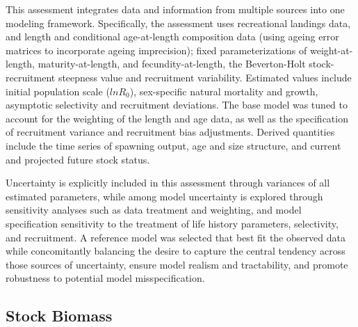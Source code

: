 \documentclass[11pt,
  english,
  a4paper,
]{article}
\begin{document}
\leavevmode\tagmcend\tagstructend\par


This assessment integrates data and information from multiple sources into one modeling framework. Specifically, the assessment uses recreational landings data, and length and conditional age-at-length composition data (using ageing error matrices to incorporate ageing imprecision); fixed parameterizations of weight-at-length, maturity-at-length, and fecundity-at-length, the Beverton-Holt stock-recruitment steepness value and recruitment variability. Estimated values include initial population scale ({\(lnR_0\)\leavevmode\tagmcend\tagstructend}), sex-specific natural mortality and growth, asymptotic selectivity and recruitment deviations. The base model was tuned to account for the weighting of the length and age data, as well as the specification of recruitment variance and recruitment bias adjustments. Derived quantities include the time series of spawning output, age and size structure, and current and projected future stock status.

\leavevmode\tagmcend\tagstructend\par


Uncertainty is explicitly included in this assessment through variances of all estimated parameters, while among model uncertainty is explored through sensitivity analyses such as data treatment and weighting, and model specification sensitivity to the treatment of life history parameters, selectivity, and recruitment. A reference model was selected that best fit the observed data while concomitantly balancing the desire to capture the central tendency across those sources of uncertainty, ensure model realism and tractability, and promote robustness to potential model misspecification.

\leavevmode\tagmcend\tagstructend\par


\hypertarget{stock-biomass}{%
\subsection*{Stock Biomass}\label{stock-biomass}}
\end{document}
